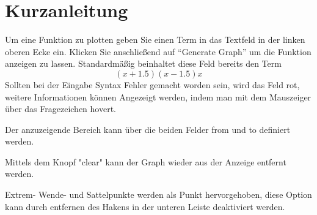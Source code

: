 \documentclass[12pt]{article}
\begin{document}
	\section*{Kurzanleitung}

	Um eine Funktion zu plotten geben Sie einen Term in das Textfeld in der linken oberen Ecke ein. Klicken Sie
	anschließend auf ``Generate Graph'' um die Funktion anzeigen zu lassen. Standardmäßig beinhaltet diese Feld
	bereits den Term 
	\[
		(x+1.5)(x-1.5)x
	\]
	Sollten bei der Eingabe Syntax Fehler gemacht worden sein, wird das Feld rot, weitere Informationen können Angezeigt werden, indem man mit dem Mauszeiger 
	über das Fragezeichen hovert.

	Der anzuzeigende Bereich kann über die beiden Felder from und to definiert werden.

	Mittels dem Knopf "clear" kann der Graph wieder aus der Anzeige entfernt werden.

	Extrem- Wende- und Sattelpunkte werden als Punkt hervorgehoben, diese Option kann durch entfernen des Hakens in der unteren Leiste deaktiviert werden.
\end{document}

